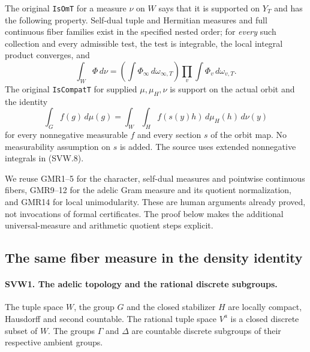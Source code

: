 \documentclass[11pt,a4paper]{article}
\numberwithin{equation}{section}
\theoremstyle{remark}\newtheorem{remark}[theorem]{Remark}
\begin{document}
The original \texttt{Is\allowbreak Om\allowbreak T} for a measure $\nu$ on $W$ says that it is
supported on $Y_T$ and has the following property.  Self-dual tuple
and Hermitian measures and full continuous fiber families exist in
the specified nested order; for \emph{every} such collection and every
admissible test, the test is integrable, the local integral product
converges, and
\[
 \int_W\Phi\,d\nu
   =\left(\int\Phi_\infty\,d\omega_{\infty,T}\right)
      \prod_v\int\Phi_v\,d\omega_{v,T}.
 \tag{SVW.7}
\]
The original \texttt{Is\allowbreak Compat\allowbreak T} for supplied $\mu,\mu_H,\nu$ is
support on the actual orbit and the identity
\[
 \int_G f(g)\,d\mu(g)
   =\int_W\int_H f(s(y)h)\,d\mu_H(h)\,d\nu(y)
 \tag{SVW.8}
\]
for every nonnegative measurable $f$ and every section $s$ of the
orbit map.  No measurability assumption on $s$ is added.  The source
uses extended nonnegative integrals in (SVW.8).

We reuse GMR1--5 for the character, self-dual measures and pointwise
continuous fibers, GMR9--12 for the adelic Gram measure and its
quotient normalization, and GMR14 for local unimodularity.  These are
human arguments already proved, not invocations of formal certificates.
The proof below makes the additional universal-measure and arithmetic
quotient steps explicit.

\subsection{The same fiber measure in the density identity}

\paragraph{SVW1. The adelic topology and the rational discrete subgroups.}
\label{claim:SVW1}
The tuple space $W$, the group $G$ and the closed stabilizer $H$ are
locally compact, Hausdorff and second countable.  The rational tuple
space $V^a$ is a closed discrete subset of $W$.  The groups $\Gamma$
and $\Delta$ are countable discrete subgroups of their respective
ambient groups.
\end{document}
